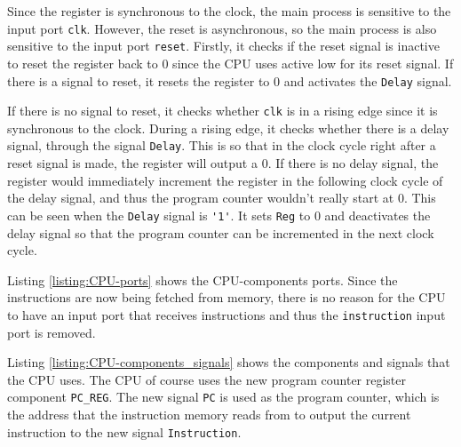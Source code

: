\documentclass[11pt]{report}
\begin{document}
Since the register is synchronous to the clock, the main process is sensitive to the input port
\verb|clk|. However, the reset is asynchronous, so the main process is also sensitive to the input
port \verb|reset|. Firstly, it checks if the reset signal is inactive to reset the register back to
0 since the CPU uses active low for its reset signal. If there is a signal to reset, it resets the
register to 0 and activates the \verb|Delay| signal.

If there is no signal to reset, it checks whether \verb|clk| is in a rising edge since it is
synchronous to the clock. During a rising edge, it checks whether there is a delay signal, through
the signal \verb|Delay|. This is so that in the clock cycle right after a reset signal is made, the
register will output a $0$. If there is no delay signal, the register would immediately increment
the register in the following clock cycle of the delay signal, and thus the program counter wouldn't
really start at $0$. This can be seen when the \verb|Delay| signal is \verb|'1'|. It sets \verb|Reg|
to 0 and deactivates the delay signal so that the program counter can be incremented in the next
clock cycle.


Listing \ref{listing:CPU-ports} shows the CPU-components ports. Since the instructions are now being
fetched from memory, there is no reason for the CPU to have an input port that receives instructions
and thus the \verb|instruction| input port is removed.

\newpage


Listing \ref{listing:CPU-components_signals} shows the components and signals that the CPU uses. The
CPU of course uses the new program counter register component \verb|PC_REG|. The new signal
\verb|PC| is used as the program counter, which is the address that the instruction memory reads
from to output the current instruction to the new signal \verb|Instruction|.
\end{document}
